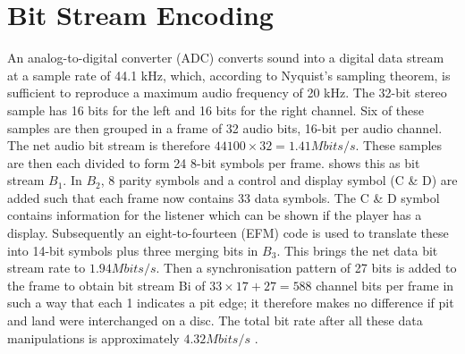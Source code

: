 \documentclass[../main.tex]{subfiles}
\begin{document}
    \section{Bit Stream Encoding}
    An analog-to-digital converter (ADC) converts sound into a digital data stream at a sample rate of 44.1 kHz, which, according to Nyquist's sampling theorem, is sufficient to reproduce a maximum audio frequency of 20 kHz. The 32-bit stereo sample has 16 bits for the left and 16 bits for the right channel. Six of these samples are then grouped in a frame of 32 audio bits, 16-bit per audio channel. The net audio bit stream is therefore $44100 \times 32=1.41 Mbits/s$. These samples are then each divided to form 24 8-bit symbols per frame.  shows this as bit stream $B_1$. In $B_2$, 8 parity symbols and a control and display symbol (C \& D) are added such that each frame now contains 33 data symbols. The C \& D symbol contains information for the listener which can be shown if the player has a display. Subsequently an eight-to-fourteen (EFM) code is used to translate these into 14-bit symbols plus three merging bits in $B_3$. This brings the net data bit stream rate to $1.94 Mbits/s$. Then a synchronisation pattern of 27 bits is added to the frame to obtain bit stream Bi of $33 \times 17+27=588$ channel bits per frame in such a way that each 1 indicates a pit edge; it therefore makes no difference if pit and land were interchanged on a disc. The total bit rate after all these data manipulations is approximately $4.32 Mbits/s$ \autocite{wicker1999reed}.


    \newcommand{\bits}[4]{%
        \begin{bytefield}[
                bitformatting={},
                bitheight=9pt,
                bitwidth=0.0125\linewidth
            ]{32}%
            \bitbox{8}{\tiny#1}
            \bitbox{8}{\tiny#2}
            \bitbox{8}{\tiny#3}
            \bitbox{8}{\tiny#4}
        \end{bytefield}%
    }%

    \newcommand{\efm}[3][8]{%
        \begin{bytefield}[
                bitformatting={\tiny\centering\itshape},
                bitheight=9pt,
                bitwidth=0.0175\linewidth*8/#1
            ]{2*#1}
            \bitbox{#1}{\tiny$#2$}
            \bitbox{1}{}
            \bitbox{#1}{\tiny$#3$}
            \bitbox{1}{}
        \end{bytefield}%
    }%
\end{document}
